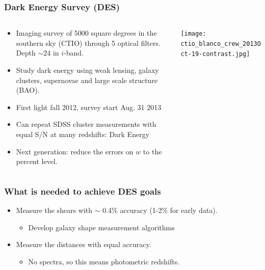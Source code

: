 \documentclass{beamer}
\begin{document}
\frame
{
    \frametitle{Dark Energy Survey (DES)}

    \fontsize{9}{0.8\baselineskip}
    \begin{columns}
        \begin{column}{0.5\textwidth}    
            \begin{itemize}

                \item Imaging survey of 5000 square degrees in the 
                    southern sky (CTIO) through 5 optical filters.  Depth $\sim 24$ in
                    $i$-band.

                \item Study dark energy using weak lensing, galaxy clusters, supernovae
                    and large scale structure (BAO).

                \item First light fall 2012, survey start Aug. 31 2013
                    
                \item Can repeat SDSS cluster measurements with equal S/N at
                    many redshifts: Dark Energy

                \item Next generation:  reduce the errors on $w$ to the percent level.

            \end{itemize}
        \end{column}
        \begin{column}{0.5\textwidth}
            \texttt{[image: ctio\_blanco\_crew\_2013Oct-19-contrast.jpg]}
        \end{column}
    \end{columns}
}


\frame
{
    \frametitle{What is needed to achieve DES goals}

    \begin{itemize}

        \item Measure the shears with $\sim$ 0.4\% accuracy (1-2\% for early data).

            \begin{itemize}
                \item Develop galaxy shape measurement algorithms
            \end{itemize}

        \item Measure the distances with equal accuracy.

        \begin{itemize}
            \item No spectra, so this means photometric redshifts.
        \end{itemize}

    \end{itemize}
}
\end{document}
